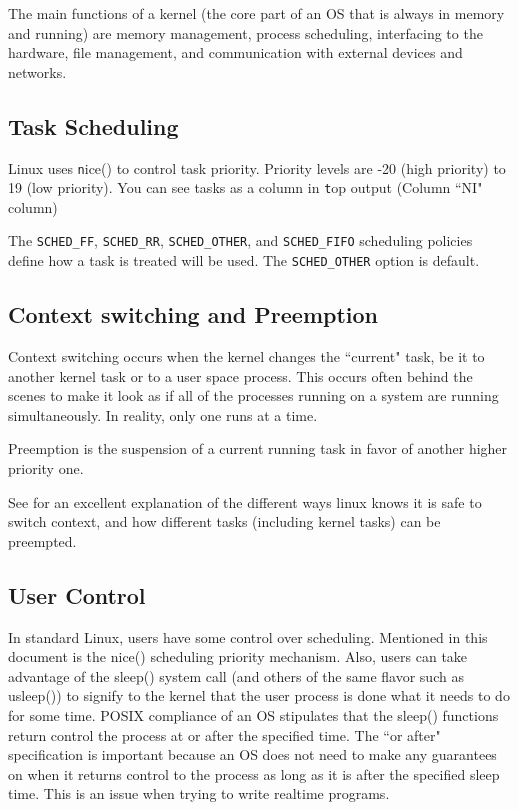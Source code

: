 \documentclass{article}
\begin{document}
The main functions of a kernel (the core part of an OS that is always in memory and running) are memory management, process scheduling, interfacing to the hardware, file management, and communication with external devices and networks. \cite{IntroLinuxForRealTime}

\subsection{Task Scheduling}
Linux uses {\texttt nice()} to control task priority.  Priority levels are -20 (high priority) to 19 (low priority).  You can see tasks as a column in {\texttt top} output (Column ``NI" column)

The {\texttt{SCHED\_FF}, \texttt{SCHED\_RR}, \texttt{SCHED\_OTHER}, and \texttt{SCHED\_FIFO}} scheduling policies define how a task is treated will be used.  The \texttt{SCHED\_OTHER} option is default.

\subsection{Context switching and Preemption}
Context switching occurs when the kernel changes the ``current" task, be it to another kernel task or to a user space process.  This occurs often behind the scenes to make it look as if all of the processes running on a system are running simultaneously.  In reality, only one runs at a time.

Preemption is the suspension of a current running task in favor of another higher priority one.

See \cite{LinuxProcessSwitch} for an excellent explanation of the different ways linux knows it is safe to switch context, and how different tasks (including kernel tasks) can be preempted.

\subsection{User Control}
In standard Linux, users have some control over scheduling.  Mentioned in this document is the nice() scheduling priority mechanism.  Also, users can take advantage of the sleep() system call (and others of the same flavor such as usleep()) to signify to the kernel that the user process is done what it needs to do for some time.  POSIX compliance of an OS stipulates that the sleep() functions return control the process at or after the specified time.  The ``or after" specification is important because an OS does not need to make any guarantees on when it returns control to the process as long as it is after the specified sleep time.  This is an issue when trying to write realtime programs.
\end{document}
